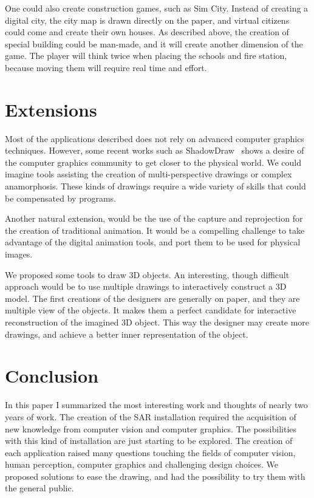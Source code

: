 \documentclass{article}
\begin{document}
One could also create construction games, such as Sim City. Instead of creating a digital city, the city map is drawn directly on the paper, and virtual citizens could come and create their own houses. As described above, the creation of special building could be man-made, and it will create another dimension of the game. The player will think twice when placing the schools and fire station, because moving them will require real time and effort. 

\section{Extensions}

Most of the applications described does not rely on advanced computer graphics techniques. However, some recent works such as ShadowDraw~\cite{leeshadowdraw} shows a desire of the computer graphics community to get closer to the physical world. We could imagine tools assisting the creation of multi-perspective drawings or complex anamorphosis. These kinds of drawings require a wide variety of skills that could be compensated by programs. 

Another natural extension, would be the use of the capture and reprojection for the creation of traditional animation. It would be a compelling challenge to take advantage of the digital animation tools, and port them to be used for physical images. 

We proposed some tools to draw 3D objects. An interesting, though difficult approach would be to use multiple drawings to interactively construct a 3D model. The first creations of the designers are generally on paper, and they are multiple view of the objects. It makes them a perfect candidate for interactive reconstruction of the imagined 3D object. This way the designer may create more drawings, and achieve a better inner representation of the object.  


\section{Conclusion}

In this paper I summarized the most interesting work and thoughts of nearly two years of work. The creation of the SAR installation required the acquisition of new knowledge from computer vision and computer graphics. The possibilities with this kind of installation are just starting to be explored. The creation of each application raised many questions touching the fields of computer vision, human perception, computer graphics and challenging design choices. We proposed solutions to ease the drawing, and had the possibility to try them with the general public. 



\end{document}
